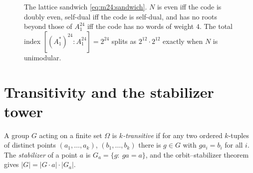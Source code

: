 \begin{figure}[t]\centering
{}
\caption{The lattice sandwich \eqref{eq:m24:sandwich}. $N$ is even iff the code is doubly
even, self-dual iff the code is self-dual, and has no roots beyond those of $A_1^{24}$ iff
the code has no words of weight $4$. The total index $[(A_1^*)^{24}:A_1^{24}]=2^{24}$ splits
as $2^{12}\cdot2^{12}$ exactly when $N$ is unimodular.}
\label{fig:m24:sandwich}
\end{figure}

\section{Transitivity and the stabilizer tower}\label{sec:m24:tower}

\begin{definition}\label{def:m24:transitive}
A group $G$ acting on a finite set $\Omega$ is \emph{$k$-transitive} if for any two ordered $k$-tuples of distinct points $(a_1,\dots,a_k)$,
$(b_1,\dots,b_k)$ there is $g\in G$ with $g a_i=b_i$ for all $i$. The \emph{stabilizer} of a
point $a$ is $G_a=\{g:\ ga=a\}$, and the orbit--stabilizer theorem gives $|G|=|G\cdot a|\cdot|G_a|$.
\end{definition}

